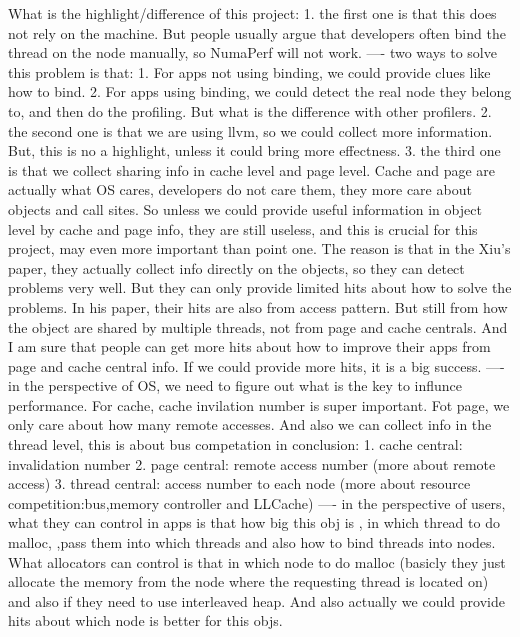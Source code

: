 What is the highlight/difference of this project:
        1. the first one is that this does not rely on the machine. But people usually argue that developers often bind the thread
on the node manually, so NumaPerf will not work.
        ---- two ways to solve this problem is that: 1. For apps not using binding, we could provide clues like how to bind. 2. For
        apps using binding, we could detect the real node they belong to, and then do the profiling. But what is the difference with
        other profilers.
        2. the second one is that we are using llvm, so we could collect more information. But, this is no a highlight, unless it could
bring more effectness.
        3. the third one is that we collect sharing info in cache level and page level. Cache and page are actually what OS cares,
developers do not care them, they more care about objects and call sites. So unless we could provide useful information
in object level by cache and page info, they are still useless, and this is crucial for this project, may even more important than point one.
The reason is that in the Xiu's paper, they actually collect info directly on the objects, so they can detect problems very well. But they
can only provide limited hits about how to solve the problems. In his paper, their hits are also from access pattern. But still
from how the object are shared by multiple threads, not from page and cache centrals. And I am sure that people can get more hits about
how to improve their apps from page and cache central info. If we could provide more hits, it is a big success.
        ---- in the perspective of OS, we need to figure out what is the key to influnce performance. For cache, cache invilation
             number is super important. Fot page, we only care about how many remote accesses. And also we can collect info
             in the thread level, this is about bus competation
             in conclusion:
                1. cache central: invalidation number
                2. page central: remote access number  (more about remote access)
                3. thread central: access number to each node (more about resource competition:bus,memory controller and LLCache)
        ---- in the perspective of users, what they can control in apps is that how big this obj is , in which thread to do malloc,
,pass them into which threads and also how to bind threads into nodes. What allocators can control is that in which node to do malloc
(basicly they just allocate the memory from the node where the requesting thread is located on) and also if they need
to use interleaved heap. And also actually we could provide hits about which node is better for this objs.
